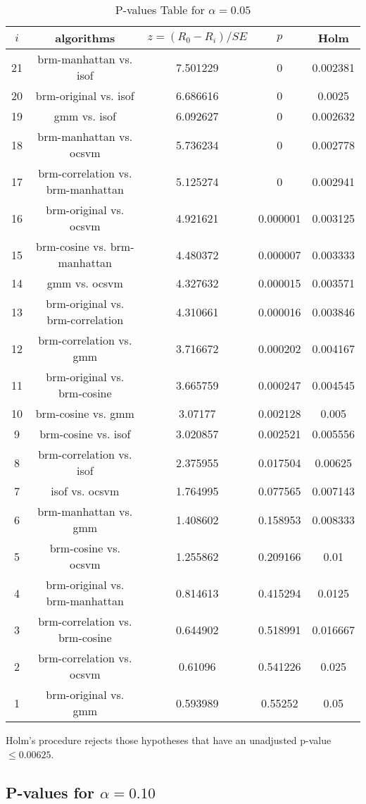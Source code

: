 \documentclass[a4paper,10pt]{article}
\begin{document}
\begin{landscape}
\begin{table}[!htp]
\centering\scriptsize
\begin{tabular}{ccccc}
$i$&algorithms&$z=(R_0 - R_i)/SE$&$p$&Holm\\
\hline21&brm-manhattan vs. isof&7.501229&0&0.002381\\
20&brm-original vs. isof&6.686616&0&0.0025\\
19&gmm vs. isof&6.092627&0&0.002632\\
18&brm-manhattan vs. ocsvm&5.736234&0&0.002778\\
17&brm-correlation vs. brm-manhattan&5.125274&0&0.002941\\
16&brm-original vs. ocsvm&4.921621&0.000001&0.003125\\
15&brm-cosine vs. brm-manhattan&4.480372&0.000007&0.003333\\
14&gmm vs. ocsvm&4.327632&0.000015&0.003571\\
13&brm-original vs. brm-correlation&4.310661&0.000016&0.003846\\
12&brm-correlation vs. gmm&3.716672&0.000202&0.004167\\
11&brm-original vs. brm-cosine&3.665759&0.000247&0.004545\\
10&brm-cosine vs. gmm&3.07177&0.002128&0.005\\
9&brm-cosine vs. isof&3.020857&0.002521&0.005556\\
8&brm-correlation vs. isof&2.375955&0.017504&0.00625\\
7&isof vs. ocsvm&1.764995&0.077565&0.007143\\
6&brm-manhattan vs. gmm&1.408602&0.158953&0.008333\\
5&brm-cosine vs. ocsvm&1.255862&0.209166&0.01\\
4&brm-original vs. brm-manhattan&0.814613&0.415294&0.0125\\
3&brm-correlation vs. brm-cosine&0.644902&0.518991&0.016667\\
2&brm-correlation vs. ocsvm&0.61096&0.541226&0.025\\
1&brm-original vs. gmm&0.593989&0.55252&0.05\\
\hline
\end{tabular}
\caption{P-values Table for $\alpha=0.05$}
\end{table}Holm's procedure rejects those hypotheses that have an unadjusted p-value $\le0.00625$.

\pagebreak

\subsection{P-values for $\alpha=0.10$}


\end{landscape}
\end{document}
